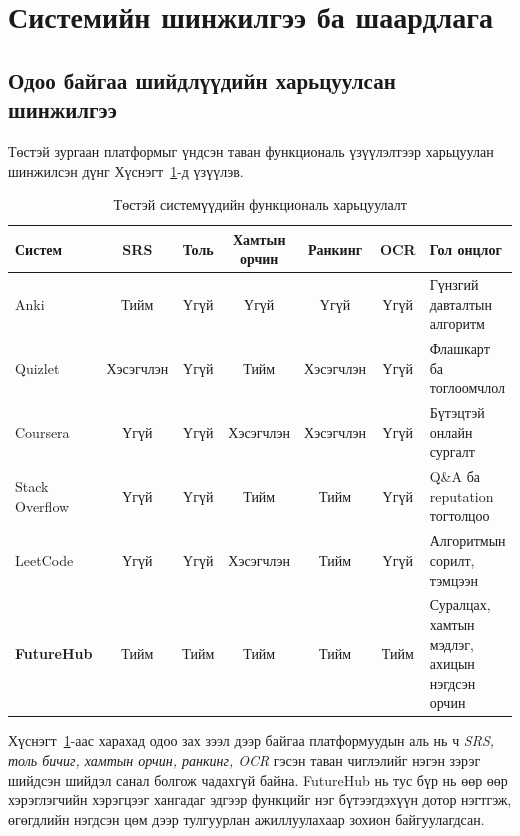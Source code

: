 \section{Системийн шинжилгээ ба шаардлага}

\subsection{Одоо байгаа шийдлүүдийн харьцуулсан шинжилгээ}

Төстэй зургаан платформыг үндсэн таван функциональ үзүүлэлтээр харьцуулан шинжилсэн дүнг Хүснэгт~\ref{tab:system-compare}-д үзүүлэв.

\begin{table}[H]
\centering
\caption{Төстэй системүүдийн функциональ харьцуулалт}
\label{tab:system-compare}
\begin{tabular}{|p{2.6cm}|c|c|c|c|c|p{3.3cm}|}
\hline
\textbf{Систем} & \textbf{SRS} & \textbf{Толь} & \textbf{Хамтын орчин} & \textbf{Ранкинг} & \textbf{OCR} & \textbf{Гол онцлог} \\ \hline
Anki & Тийм & Үгүй & Үгүй & Үгүй & Үгүй & Гүнзгий давталтын алгоритм \\ \hline
Quizlet & Хэсэгчлэн & Үгүй & Тийм & Хэсэгчлэн & Үгүй & Флашкарт ба тоглоомчлол \\ \hline
Coursera & Үгүй & Үгүй & Хэсэгчлэн & Хэсэгчлэн & Үгүй & Бүтэцтэй онлайн сургалт \\ \hline
Stack Overflow & Үгүй & Үгүй & Тийм & Тийм & Үгүй & Q\&A ба reputation тогтолцоо \\ \hline
LeetCode & Үгүй & Үгүй & Хэсэгчлэн & Тийм & Үгүй & Алгоритмын сорилт, тэмцээн \\ \hline
\textbf{FutureHub} & Тийм & Тийм & Тийм & Тийм & Тийм & Суралцах, хамтын мэдлэг, ахицын нэгдсэн орчин \\ \hline
\end{tabular}
\end{table}

Хүснэгт~\ref{tab:system-compare}-аас харахад одоо зах зээл дээр байгаа платформуудын аль нь ч \textit{SRS, толь бичиг, хамтын орчин, ранкинг, OCR} гэсэн таван чиглэлийг нэгэн зэрэг шийдсэн шийдэл санал болгож чадахгүй байна. FutureHub нь тус бүр нь өөр өөр хэрэглэгчийн хэрэгцээг хангадаг эдгээр функцийг нэг бүтээгдэхүүн дотор нэгтгэж, өгөгдлийн нэгдсэн цөм дээр тулгуурлан ажиллуулахаар зохион байгуулагдсан.

